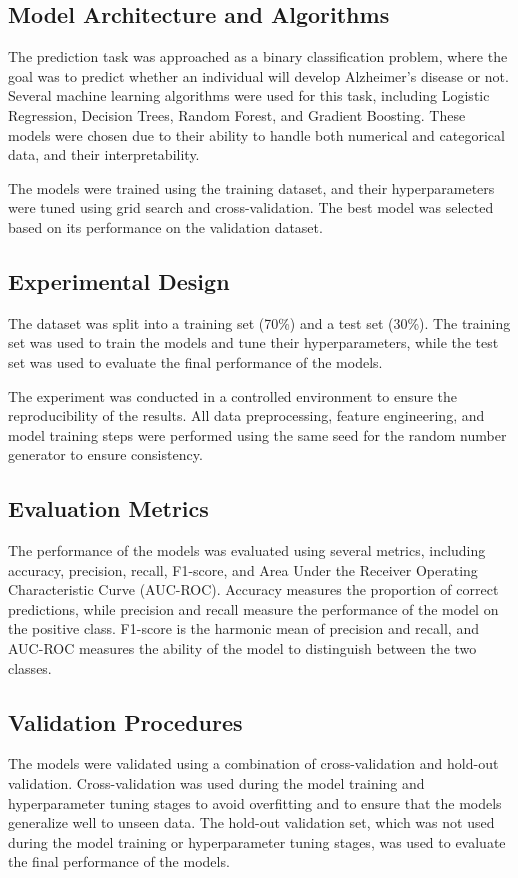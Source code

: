 \documentclass[conference]{IEEEtran}
\begin{document}
\subsection{Model Architecture and Algorithms}
The prediction task was approached as a binary classification problem, where the goal was to predict whether an individual will develop Alzheimer's disease or not. Several machine learning algorithms were used for this task, including Logistic Regression, Decision Trees, Random Forest, and Gradient Boosting. These models were chosen due to their ability to handle both numerical and categorical data, and their interpretability.

The models were trained using the training dataset, and their hyperparameters were tuned using grid search and cross-validation. The best model was selected based on its performance on the validation dataset.

\subsection{Experimental Design}
The dataset was split into a training set (70\%) and a test set (30\%). The training set was used to train the models and tune their hyperparameters, while the test set was used to evaluate the final performance of the models.

The experiment was conducted in a controlled environment to ensure the reproducibility of the results. All data preprocessing, feature engineering, and model training steps were performed using the same seed for the random number generator to ensure consistency.

\subsection{Evaluation Metrics}
The performance of the models was evaluated using several metrics, including accuracy, precision, recall, F1-score, and Area Under the Receiver Operating Characteristic Curve (AUC-ROC). Accuracy measures the proportion of correct predictions, while precision and recall measure the performance of the model on the positive class. F1-score is the harmonic mean of precision and recall, and AUC-ROC measures the ability of the model to distinguish between the two classes.

\subsection{Validation Procedures}
The models were validated using a combination of cross-validation and hold-out validation. Cross-validation was used during the model training and hyperparameter tuning stages to avoid overfitting and to ensure that the models generalize well to unseen data. The hold-out validation set, which was not used during the model training or hyperparameter tuning stages, was used to evaluate the final performance of the models.
\end{document}
